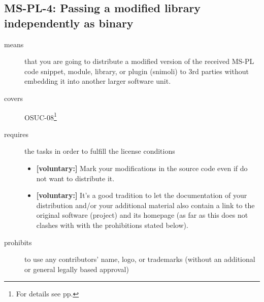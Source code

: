 \subsection{MS-PL-4: Passing a modified library independently as binary}
\label{OSUC-08-MS-PL}
\begin{description}
\item[means] that you are going to distribute a modified version of the received
MS-PL code snippet, module, library, or plugin (snimoli) to 3rd parties without
embedding it into another larger software unit.
\item[covers] OSUC-08\footnote{For details see pp. \pageref{OSUC-08-DEF}}
\item[requires] the tasks in order to fulfill the license conditions

\begin{itemize}
  
  \item \textbf{[voluntary:]} Mark your modifications in the source code even if
  do not want to distribute it.
  
  \item \textbf{[voluntary:]} It's a good tradition to let the documentation of
  your distribution and/or your additional material also contain a link to the
  original software (project) and its homepage (as far as this does not clashes
  with with the prohibitions stated below).
    
\end{itemize}

\item[prohibits] to use any contributors' name, logo, or trademarks (without an
additional or general legally based approval)

\end{description}


